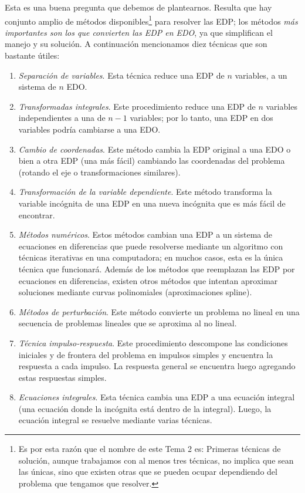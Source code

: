 Esta es una buena pregunta que debemos de plantearnos. Resulta que hay conjunto amplio de métodos disponibles\footnote{Es por esta razón que el nombre de este Tema 2 es: Primeras técnicas de solución, aunque trabajamos con al menos tres técnicas, no implica que sean las únicas, sino que existen otras que se pueden ocupar dependiendo del problema que tengamos que resolver.} para resolver las EDP; los métodos \emph{más importantes son los que convierten las EDP en EDO}, ya que simplifican el manejo y su solución. A continuación mencionamos diez técnicas que son bastante útiles:
\begin{enumerate}
\item \emph{Separación de variables}. Esta técnica reduce una EDP de $n$ variables, a un sistema de $n$ EDO.
\item \emph{Transformadas integrales}. Este procedimiento reduce una EDP de $n$ variables independientes a una de $n - 1$ variables; por lo tanto, una EDP en dos variables podría cambiarse a una EDO.
\item \emph{Cambio de coordenadas}. Este método cambia la EDP original a una EDO o bien a otra EDP (una más fácil) cambiando las coordenadas del problema (rotando el eje o transformaciones similares).
\item \emph{Transformación de la variable dependiente}. Este método transforma la variable incógnita de una EDP en una nueva incógnita que es más fácil de encontrar.
\item \emph{Métodos numéricos}. Estos métodos cambian una EDP a un sistema de ecuaciones en diferencias que puede resolverse mediante un algoritmo con técnicas iterativas en una computadora; en muchos casos, esta es la única técnica que funcionará. Además de los métodos que reemplazan las EDP por ecuaciones en diferencias, existen otros métodos que intentan aproximar soluciones mediante curvas polinomiales (aproximaciones spline).
\item \emph{Métodos de perturbación}. Este método convierte un problema no lineal en una secuencia de problemas lineales que se aproxima al no lineal.
\item \emph{Técnica impulso-respuesta}. Este procedimiento descompone las condiciones iniciales y de frontera del problema en impulsos simples y encuentra la respuesta a cada impulso. La respuesta general se encuentra luego agregando estas respuestas simples.
\item \emph{Ecuaciones integrales}. Esta técnica cambia una EDP a una ecuación integral (una ecuación donde la incógnita está dentro de la integral). Luego, la ecuación integral se resuelve mediante varias técnicas.

\end{enumerate}
